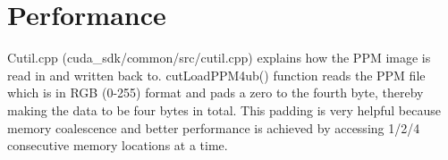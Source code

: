 \chapter{Performance}
\label{ch:performance}
Cutil.cpp (cuda_sdk/common/src/cutil.cpp) explains how the PPM image is read in
and written back to. cutLoadPPM4ub() function reads the PPM file which is in RGB
(0-255) format and pads a zero to the fourth byte, thereby making the data to be
four bytes in total. This padding is very helpful because memory coalescence and
better performance is achieved by accessing 1/2/4 consecutive memory locations
at a time.

